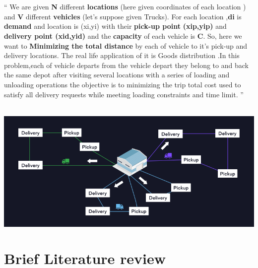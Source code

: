 \documentclass[conference]{IEEEtran}
\begin{document}
\\ \\
“ We are given\textbf{ N }different\textbf{ locations} (here given coordinates of each location ) and \textbf{V} different \textbf{vehicles} (let's suppose given Trucks). For each location ,\textbf{di }is \textbf{demand}  and location is (xi,yi) with their \textbf{pick-up point }\textbf{(xip,yip)} and \textbf{delivery point (xid,yid)}  and the\textbf{ capacity }of each vehicle is \textbf{C}. So, here we want to \textbf{Minimizing the total distance} by each of vehicle to it’s pick-up and delivery locations. The real life application of it is Goods distribution .In this problem,each of vehicle departs from the vehicle depart  they belong to and back the same depot after visiting several locations with a series of loading and unloading operations the objective is to minimizing the trip total cost used to satisfy all delivery requests while meeting loading constraints and time limit. ”
\\
\\
\begin{center}
\includegraphics[width=1\linewidth ]{
opt2.png}\par  
\end{center}
\hline
\vspace{5}
\newline
\section{{\textbf{Brief Literature review}}}
\end{document}
